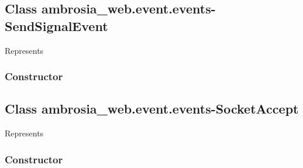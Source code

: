 \documentclass[letterpaper,10pt,english]{sphinxmanual}
\begin{document}
\begin{fulllineitems}
\label{ambrosia_web.event.events-SendSignal:ambrosia_web.event.events-SendSignal}
\end{fulllineitems}



\subsection{Class ambrosia\_web.event.events-SendSignalEvent}
\label{ambrosia_web.event.events-SendSignalEvent:class-ambrosia-web-event-events-sendsignalevent}\label{ambrosia_web.event.events-SendSignalEvent::doc}
Represents {\hyperref[ambrosia_plugins.lkm:ambrosia_plugins.lkm.events.SendSignalEvent]{}}


\subsubsection{Constructor}
\label{ambrosia_web.event.events-SendSignalEvent:constructor}

\begin{fulllineitems}
\label{ambrosia_web.event.events-SendSignalEvent:ambrosia_web.event.events-SendSignalEvent}
\end{fulllineitems}



\subsection{Class ambrosia\_web.event.events-SocketAccept}
\label{ambrosia_web.event.events-SocketAccept:class-ambrosia-web-event-events-socketaccept}\label{ambrosia_web.event.events-SocketAccept::doc}
Represents 


\subsubsection{Constructor}
\label{ambrosia_web.event.events-SocketAccept:constructor}

\begin{fulllineitems}
\label{ambrosia_web.event.events-SocketAccept:ambrosia_web.event.events-SocketAccept}
\end{fulllineitems}
\end{document}
